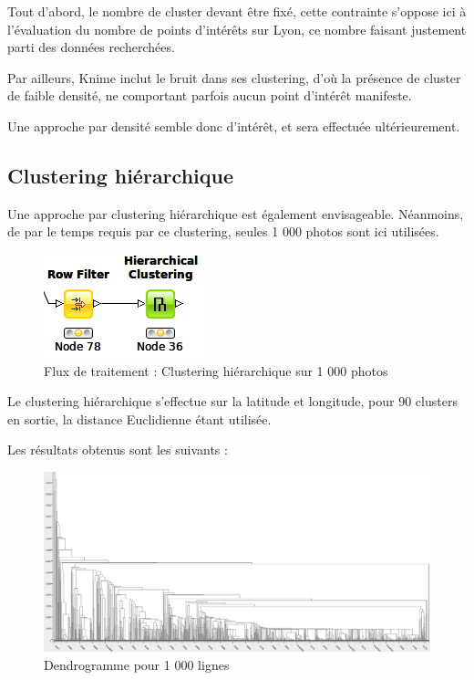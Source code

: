 Tout d'abord, le nombre de cluster devant être fixé, cette contrainte s'oppose ici à l'évaluation du nombre de points d'intérêts sur Lyon, ce nombre faisant justement parti des données recherchées.

Par ailleurs, Knime inclut le bruit dans ses clustering, d'où la présence de cluster de faible densité, ne comportant parfois aucun point d'intérêt manifeste.

Une approche par densité semble donc d'intérêt, et sera effectuée ultérieurement.
\pagebreak



\subsection{Clustering hiérarchique}
Une approche par clustering hiérarchique est également envisageable. Néanmoins, de par le temps requis par ce clustering, seules 1 000 photos sont ici utilisées.

\begin{figure}[h!]
    \centering
    \includegraphics[width=\linewidth]{img/knime_hierarchical.png}
    \caption{Flux de traitement : Clustering hiérarchique sur 1 000 photos}
\end{figure}

Le clustering hiérarchique s'effectue sur la latitude et longitude, pour 90 clusters en sortie, la distance Euclidienne étant utilisée.

Les résultats obtenus sont les suivants :
\begin{figure}[h!]
    \centering
    \includegraphics[width=\linewidth]{img/1000_histo1.png}
    \caption{Dendrogramme pour 1 000 lignes}
\end{figure}


